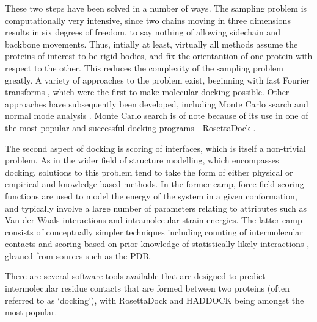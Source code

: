 \documentclass[a4paper,11pt,twoside,openright]{scrbook}
\begin{document}
These two steps have been solved in a number of ways. The sampling problem is computationally very intensive, since two chains moving in three dimensions results in six degrees of freedom, to say nothing of allowing sidechain and backbone movements. Thus, intially at least, virtually all methods assume the proteins of interest to be rigid bodies, and fix the orientantion of one protein with respect to the other. This reduces the complexity of the sampling problem greatly. A variety of approaches to the problem exist, beginning with fast Fourier transforms \cite{Katchalski-Katzir1992}, which were the first to make molecular docking possible. Other approaches have subsequently been developed, including Monte Carlo search \cite{Hart1992} and normal mode analysis \cite{Zacharias2005}. Monte Carlo search is of note because of its use in one of the most popular and successful docking programs - RosettaDock \cite{Lyskov2008,Zhang2015}.

The second aspect of docking is scoring of interfaces, which is itself a non-trivial problem. As in the wider field of structure modelling, which encompasses docking, solutions to this problem tend to take the form of either physical or empirical and knowledge-based methods. In the former camp, force field scoring functions \cite{Kynast2016} are used to model the energy of the system in a given conformation, and typically involve a large number of parameters relating to attributes such as Van der Waals interactions and intramolecular strain energies. The latter camp consists of conceptually simpler techniques including counting of intermolecular contacts \cite{Bohm1998} and scoring based on prior knowledge of statistically likely interactions \cite{Sasse2017}, gleaned from sources such as the PDB.

There are several software tools available that are designed to predict intermolecular residue contacts that are formed between two proteins (often referred to as `docking'), with RosettaDock \cite{Lyskov2008} and HADDOCK \cite{Dominguez2003,VanZundert2016} being amongst the most popular.
\end{document}

